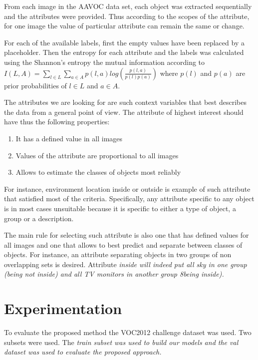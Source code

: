 \documentclass[conference]{IEEEtran}
\begin{document}
From each image in the AAVOC data set, each object was extracted sequentially and the attributes were provided. Thus according to the scopes of the attribute, for one image the value of particular attribute can remain the same or change. 


For each of the available labels, first the empty values have been replaced by a placeholder. Then the entropy for each attribute and the labels was calculated using the Shannon's entropy the mutual information according to $I(L,A)= \sum_{l\in L}\sum_{a\in A}p(l,a)log\left ( \frac{p(l,a)}{p(l)p(a)}\right )$ where $p(l)$ and $p(a)$ are prior probabilities of $l\in L$ and $a\in A$.  

The attributes we are looking for are such context variables that best describes the data from a general point of view. The attribute of highest interest should have thus the following properties:
\begin{enumerate}
	\item It has a defined value in all images
	\item Values of the attribute are proportional to all images
	\item Allows to estimate the classes of objects most reliably
\end{enumerate}

For instance, environment location inside or outside is example of such attribute that satisfied most of the criteria. Specifically, any attribute specific to any object is in most cases unsuitable because it is specific to either a type of object, a group or a description. 

The main rule for selecting such attribute is also one that has defined values for all images and one that allows to best predict and separate between classes of objects. For instance, an attribute separating objects in two groups of non overlapping sets is desired. Attribute \em inside \em will indeed put all sky in one group (being not \em inside\em) and all TV monitors in another group 8being \em inside\em). 


\section{Experimentation}
\label{sec:exp}

To evaluate the proposed method the VOC2012 challenge dataset was used. Two subsets were used. The \em train \em subset was used to build our models and the \em val \em dataset was used to evaluate the proposed approach. 
\end{document}
